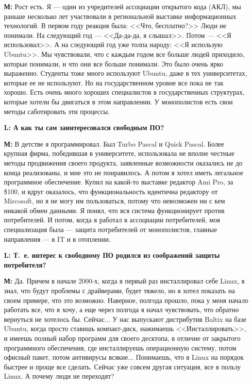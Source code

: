 \documentclass[10pt, a5paper]{article}
\begin{document}
{\noindent \bf М:} Рост есть. Я --- один из учредителей ассоциации открытого кода (АКЛ), мы раньше несколько лет участвовали в региональной выставке информационных технологий. В первом году реакция была: <<Что, бесплатно?>> Люди не понимали. На следующий год --- <<Да-да-да, я слышал>>. Потом --- <<Я использовал>>. А на следующий год уже толпа народу: <<Я использую Ubuntu>>. Мы чувствовали, что с каждым годом все больше людей приходило, которые понимали, и что они все больше понимали. Это было очень ярко выраженно. Студенты тоже много используют Ubuntu, даже в тех университетах, которые ее не используют. Но на государственном уровне все пока не так хорошо. Есть очень много хороших специалистов в государственных структурах, которые хотели бы двигаться в этом направлении. У монополистов есть свои методы саботировать эти процессы.

{\noindent \bf L: А как ты сам заинтересовался свободным ПО?}

{\noindent \bf М:} В детстве я программировал. Был Turbo Pascal и  Quick Pascal. Более крупная фирма, победившая в университете, использовала не вполне честные методы продвижения своего продукта, заявленные возможности оказались не до конца реализованы, и мне это не понравилось. А потом я хотел иметь легальное программное обеспечение. Купил на какой-то выставке редактор Ami Pro, за \$100, и вдруг оказалось, что функциональность идентична редактору от Mircosoft, но я не могу им пользоваться, потому что невозможен ни с кем никакой обмен данными. Я понял, что вся система функционирует против потребителей. И потом, когда я работал в ассоциации потребителей, моя специализация была --- защита потребителей от монополистов, главные направления --- в IT  и в отоплении.

{\noindent \bf L: Т.~е. интерес к свободному ПО родился из соображений защиты потребителя?}

{\noindent \bf М:} Да. Причем в начале 2000-х, когда я первый раз инсталлировал себе Linux, я знал, что будут проблемы с драйверами, будет тяжело, но я хотел показать на своем примере, что это возможно. Наверное, полгода прошло, пока у меня начало работать все, что я хочу, а еще через полгода я начал чувствовать, что  обратно вернуться не хотелось бы. Сейчас... У нас выпускают дистрибутив Baltix на базе Ubuntu, когда просто ставишь компакт-диск, нажимаешь <<Инсталлировать>>, и имеешь полный набор программ для своего десктопа, в отличие от закрытого программного обеспечения, где инсталлируешь операционную систему, потом офисный пакет, потом антивирусы всякие... Понимаешь, что в Linux  на порядок быстрее и проще все сделать. Сейчас уже совсем другая ситуация, все в пользу Linux. А почему люди не переходят?
\end{document}

